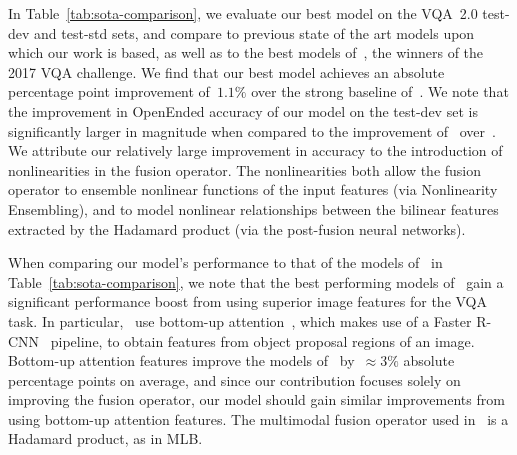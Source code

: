 In Table~\ref{tab:sota-comparison}, we evaluate our best model on the VQA~2.0
test-dev and test-std sets, and compare to previous state of the art models
upon which our work is based, as well as to the best models
of~\cite{teney2017tips}, the winners of the 2017 VQA challenge. We
find that our best model achieves an absolute percentage point improvement
of~$1.1\%$ over the strong baseline of~\cite{ben2017mutan}. We note that the
improvement in OpenEnded accuracy of our model on the test-dev set is
significantly larger in magnitude when compared to the improvement
of~\cite{ben2017mutan} over~\cite{fukui2016multimodalCB}. We attribute
our relatively large improvement in accuracy to the introduction of
nonlinearities in the fusion operator. The nonlinearities both allow the fusion
operator to ensemble nonlinear functions of the input features (via
Nonlinearity Ensembling), and to model nonlinear relationships between the
bilinear features extracted by the Hadamard product (via the post-fusion neural
networks).

When comparing our model's performance to that of the models
of~\cite{teney2017tips} in Table~\ref{tab:sota-comparison}, we note that the
best performing models of~\cite{teney2017tips} gain a significant performance
boost from using superior image features for the VQA task. In
particular,~\cite{teney2017tips} use bottom-up
attention~\cite{anderson2017bottom}, which makes use of a Faster
R-CNN~\cite{ren2015faster} pipeline, to obtain features from object proposal
regions of an image. Bottom-up attention features improve the models
of~\cite{teney2017tips} by~$\approx 3\%$ absolute percentage points on average,
and since our contribution focuses solely on improving the fusion operator, our
model should gain similar improvements from using bottom-up attention features.
The multimodal fusion operator used in~\cite{teney2017tips} is a Hadamard
product, as in MLB\@.

